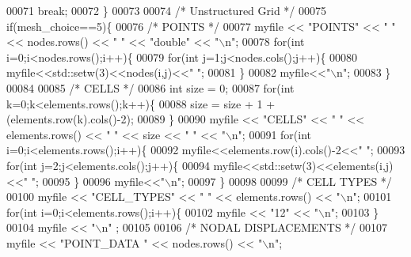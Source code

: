 \begin{DoxyCode}
00071         \textcolor{keywordflow}{break};
00072     \}
00073 
00074     \textcolor{comment}{/* Unstructured Grid */}
00075     \textcolor{keywordflow}{if}(mesh\_choice==5)\{
00076         \textcolor{comment}{/* POINTS */}
00077         myfile << \textcolor{stringliteral}{"POINTS"} << \textcolor{stringliteral}{" "} << nodes.rows() << \textcolor{stringliteral}{" "} << \textcolor{stringliteral}{"double"} << \textcolor{stringliteral}{"\(\backslash\)n"};
00078         \textcolor{keywordflow}{for}(\textcolor{keywordtype}{int} i=0;i<nodes.rows();i++)\{
00079             \textcolor{keywordflow}{for}(\textcolor{keywordtype}{int} j=1;j<nodes.cols();j++)\{
00080                 myfile<<std::setw(3)<<nodes(i,j)<<\textcolor{stringliteral}{" "};
00081             \}
00082             myfile<<\textcolor{stringliteral}{"\(\backslash\)n"};
00083         \}
00084 
00085         \textcolor{comment}{/* CELLS */}
00086         \textcolor{keywordtype}{int} size = 0;
00087         \textcolor{keywordflow}{for}(\textcolor{keywordtype}{int} k=0;k<elements.rows();k++)\{
00088                 size = size + 1 + (elements.row(k).cols()-2);
00089         \}
00090         myfile << \textcolor{stringliteral}{"CELLS"} << \textcolor{stringliteral}{" "} << elements.rows() << \textcolor{stringliteral}{" "} << size << \textcolor{stringliteral}{" "} << \textcolor{stringliteral}{"\(\backslash\)n"};
00091         \textcolor{keywordflow}{for}(\textcolor{keywordtype}{int} i=0;i<elements.rows();i++)\{
00092             myfile<<elements.row(i).cols()-2<<\textcolor{stringliteral}{" "};
00093             \textcolor{keywordflow}{for}(\textcolor{keywordtype}{int} j=2;j<elements.cols();j++)\{
00094                 myfile<<std::setw(3)<<elements(i,j)<<\textcolor{stringliteral}{" "};
00095             \}
00096             myfile<<\textcolor{stringliteral}{"\(\backslash\)n"};
00097         \}
00098 
00099         \textcolor{comment}{/* CELL TYPES */}
00100         myfile << \textcolor{stringliteral}{"CELL\_TYPES"} << \textcolor{stringliteral}{" "} << elements.rows() << \textcolor{stringliteral}{"\(\backslash\)n"};
00101         \textcolor{keywordflow}{for}(\textcolor{keywordtype}{int} i=0;i<elements.rows();i++)\{
00102                     myfile << \textcolor{stringliteral}{"12"} << \textcolor{stringliteral}{"\(\backslash\)n"};
00103         \}
00104         myfile << \textcolor{stringliteral}{"\(\backslash\)n"} ;
00105 
00106         \textcolor{comment}{/* NODAL DISPLACEMENTS */}
00107         myfile << \textcolor{stringliteral}{"POINT\_DATA "} << nodes.rows() << \textcolor{stringliteral}{"\(\backslash\)n"};

\end{DoxyCode}
